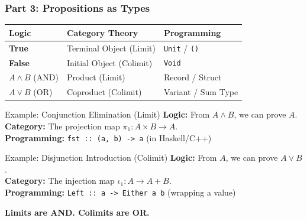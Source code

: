\documentclass[11pt,t,usepdftitle=false,aspectratio=169]{beamer}
\begin{document}
\begin{frame}
\frametitle{Part 3: Propositions as Types}

  \centering
  \renewcommand{\arraystretch}{1.4}
  \begin{tabular}{@{}lll@{}}
    \toprule
    \textbf{Logic} & \textbf{Category Theory} & \textbf{Programming} \\
    \midrule
    \textbf{True} & Terminal Object (Limit) & \texttt{Unit} / \texttt{()} \\
    \textbf{False} & Initial Object (Colimit) & \texttt{Void} \\
    \midrule
    \(A \land B\) (AND) & Product (Limit) & Record / Struct \\
    \(A \lor B\) (OR) & Coproduct (Colimit) & Variant / Sum Type \\
    \bottomrule
  \end{tabular}
  
  \begin{overprint}
    \begin{block}{Example: Conjunction Elimination (Limit)}
      \textbf{Logic:} From \(A \land B\), we can prove \(A\). \\
      \textbf{Category:} The projection map \(\pi_1 : A \times B \to A\). \\
      \textbf{Programming:} \texttt{fst :: (a, b) -> a} (in Haskell/C++)
    \end{block}
    \begin{alertblock}{Example: Disjunction Introduction (Colimit)}
      \textbf{Logic:} From \(A\), we can prove \(A \lor B\). \\
      \textbf{Category:} The injection map \(\iota_1 : A \to A + B\). \\
      \textbf{Programming:} \texttt{Left :: a -> Either a b} (wrapping a value)
    \end{alertblock}
    \vspace{0.4cm}
    \centering
    {\large \textbf{Limits are AND. Colimits are OR.}}
    \par
  \end{overprint}
\end{frame}
\end{document}
